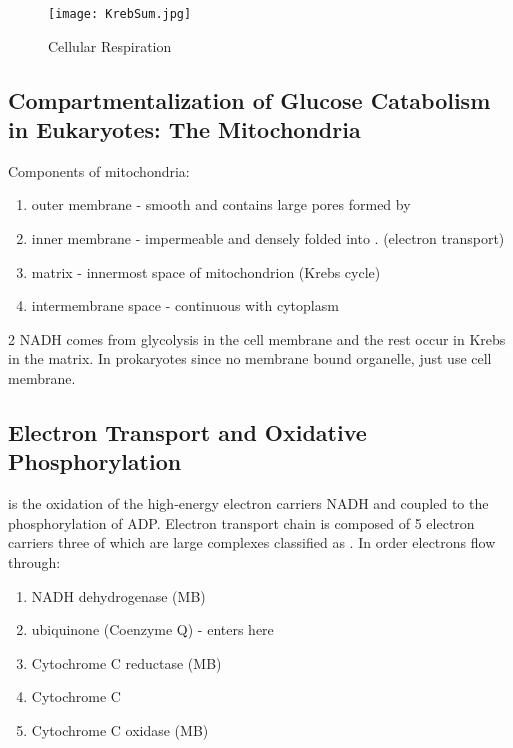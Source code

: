 \documentclass[../Bio_chemistryReview.tex]{subfiles}
\begin{document}
\begin{figure}[h]
  \centering
  \texttt{[image: KrebSum.jpg]}
  \caption{Cellular Respiration}
\end{figure}

\subsection{Compartmentalization of Glucose Catabolism in Eukaryotes: The
Mitochondria}

Components of mitochondria:
\begin{enumerate}
  \item outer membrane - smooth and contains large pores formed by 
  \item inner membrane - impermeable and densely folded into .
    (electron transport) 
  \item matrix - innermost space of mitochondrion (Krebs
    cycle)
  \item intermembrane space - continuous with cytoplasm
\end{enumerate}

2 NADH comes from glycolysis in the cell membrane and the rest occur in Krebs in
the matrix. In prokaryotes since no membrane bound organelle, just use cell
membrane.

\subsection{Electron Transport and Oxidative Phosphorylation}

 is the oxidation of the high-energy electron
carriers NADH and  coupled to the phosphorylation of ADP.
Electron transport chain is composed of 5 electron carriers three of which are
large complexes classified as . In order electrons flow
through: 
\begin{infobox}
  \begin{enumerate}
    \item NADH dehydrogenase (MB)
    \item ubiquinone (Coenzyme Q) -  enters here
    \item Cytochrome C reductase (MB)
    \item Cytochrome C
    \item Cytochrome C oxidase (MB)
  \end{enumerate}
\end{infobox}
\end{document}

